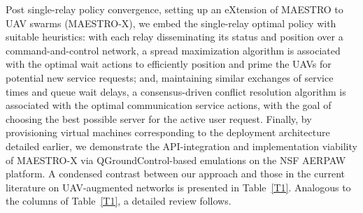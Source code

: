 \documentclass[12pt, draftcls, onecolumn]{IEEEtran}
\theoremstyle{plain}
\theoremstyle{definition}
\theoremstyle{remark}
\begin{document}
Post single-relay policy convergence, setting up an eXtension of MAESTRO to UAV swarms (MAESTRO-X), we embed the single-relay optimal policy with suitable heuristics: with each relay disseminating its status and position over a command-and-control network, a spread maximization algorithm is associated with the optimal wait actions to efficiently position and prime the UAVs for potential new service requests; and, maintaining similar exchanges of service times and queue wait delays, a consensus-driven conflict resolution algorithm is associated with the optimal communication service actions, with the goal of choosing the best possible server for the active user request. Finally, by provisioning virtual machines corresponding to the deployment architecture detailed earlier, we demonstrate the API-integration and implementation viability of MAESTRO-X via QGroundControl-based emulations on the NSF AERPAW platform. A condensed contrast between our approach and those in the current literature on UAV-augmented networks is presented in Table~\ref{T1}. Analogous to the columns of Table~\ref{T1}, a detailed review follows.
\end{document}

